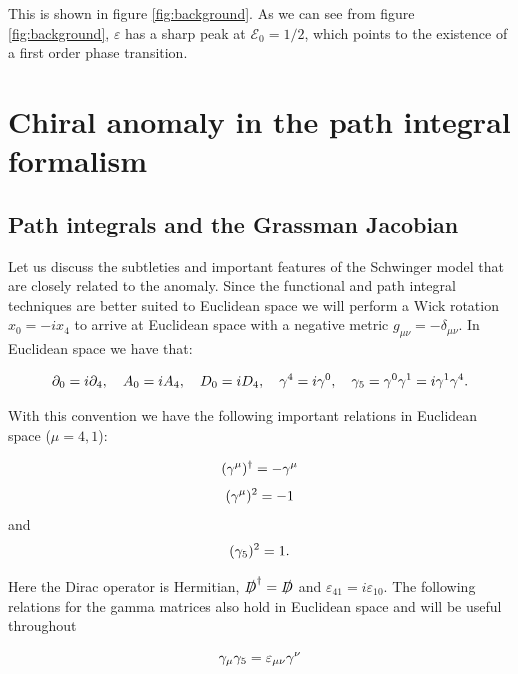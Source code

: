This is shown in figure  \ref{fig:background}. As we can see from figure \ref{fig:background}, $\varepsilon$ has a sharp peak at  $\mathcal{E}_0=1/2$, which points to the existence of a first order phase transition.




\section{Chiral anomaly in the path integral formalism}\label{sec:ChiralAnomaly}

\subsection{Path integrals and the Grassman Jacobian}\label{ssec:PathIntegral}

Let us discuss the subtleties and important features of the Schwinger model that are closely related to the anomaly. Since the functional and path integral techniques are better suited to Euclidean space we will perform a Wick rotation $x_0 = -ix_4$ to arrive at Euclidean space with a negative metric $g_{\mu\nu} = -\delta_{\mu\nu}$. In Euclidean space we have that:

\begin{equation*}
    \partial_0 = i \partial_4,\quad A_0 =i A_4,\quad D_0 = iD_4,\quad\gamma^4 = i\gamma^0,\quad\gamma_5=\gamma^0 \gamma^1 = i\gamma^1\gamma^4.
\end{equation*}
 
With this convention we have the following important relations in Euclidean space ($\mu = 4,1$):

\begin{equation}
    (\gamma^\mu)^\dagger = -\gamma^\mu
\end{equation}
\begin{equation}
    (\gamma^\mu)^2 = -1
\end{equation}
and
\begin{equation}
    (\gamma_5)^2 = 1.
\end{equation}

Here the Dirac operator is Hermitian, $\slashed{D}^\dagger=\slashed{D}$ and $\varepsilon_{41} = i\varepsilon_{10}$. The following relations for the gamma matrices also hold in Euclidean space and will be useful throughout

\begin{equation}
    \gamma_\mu \gamma_5 = \varepsilon_{\mu\nu}\gamma^\nu
\end{equation}

